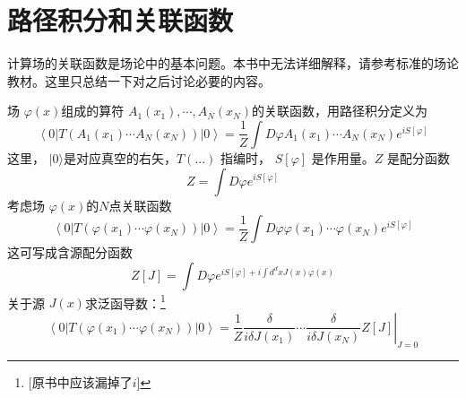 \section{路径积分和关联函数}

计算场的关联函数是场论中的基本问题。本书中无法详细解释，请参考标准的场论教材。这里只总结一下对之后讨论必要的内容。

场 $\varphi(x) $组成的算符 $A_{1}\left(x_{1}\right), \cdots, A_{N}\left(x_{N}\right) $的关联函数，用路径积分定义为
\begin{equation}
	\left\langle 0\left|T\left(A_{1}\left(x_{1}\right) \cdots A_{N}\left(x_{N}\right)\right)\right| 0\right\rangle=\frac{1}{Z} \int D \varphi A_{1}\left(x_{1}\right) \cdots A_{N}\left(x_{N}\right) e^{i S[\varphi]}
\end{equation}
这里， $|0\rangle $是对应真空的右矢，$ T(...)$ 指编时， $S[\varphi]$ 是作用量。$ Z$ 是配分函数
\begin{equation}
	Z=\int D \varphi e^{i S[\varphi]}
\end{equation}
考虑场 $\varphi(x) $的$ N $点关联函数
\begin{equation}
		\left\langle 0\left|T\left(\varphi\left(x_{1}\right) \cdots \varphi\left(x_{N}\right)\right)\right| 0\right\rangle=\frac{1}{Z} \int D \varphi \varphi\left(x_{1}\right) \cdots \varphi\left(x_{N}\right) e^{i S[\varphi]}
\end{equation}
这可写成含源配分函数
\begin{equation}
		Z[J]=\int D \varphi e^{i S[\varphi]+i \int d^{d} x J(x) \varphi(x)}
\end{equation}
关于源 $J(x) $求泛函导数：\footnote{[原书中应该漏掉了$i$]}
\begin{equation}
		\left\langle 0\left|T\left(\varphi\left(x_{1}\right) \cdots \varphi\left(x_{N}\right)\right)\right| 0\right\rangle=\left.\frac{1}{Z} \frac{\delta}{i\delta J\left(x_{1}\right)} \cdots \frac{\delta}{i\delta J\left(x_{N}\right)} Z[J]\right|_{J=0}
\end{equation}

